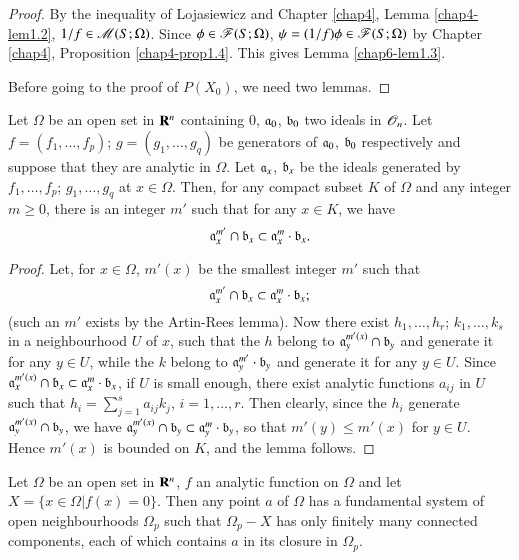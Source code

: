\begin{proof}
By the inequality of Lojasiewicz and Chapter \ref{chap4}, Lemma \ref{chap4-lem1.2}, $1/f\in \mathscr{M}(S;\Omega)$. Since $\phi\in \mathscr{F}(S;\Omega)$, $\psi=(1/f)\phi\in\mathscr{F}(S;\Omega)$ by Chapter \ref{chap4}, Proposition \ref{chap4-prop1.4}. This gives Lemma \ref{chap6-lem1.3}.

Before going to the proof of $P(X_{0})$, we need two lemmas.
\end{proof}

\begin{lemma}\label{chap6-lem1.4}
Let $\Omega$ be an open set in $\mathbf{R}^{n}$ containing $0$, $\mathfrak{a}_{0}$, $\mathfrak{b}_{0}$ two ideals in $\mathscr{O}_{n}$. Let $f=(f_{1},\ldots,f_{p})$; $g=(g_{1},\ldots,g_{q})$ be generators of $\mathfrak{a}_{0}$, $\mathfrak{b}_{0}$ respectively and suppose that they are analytic in $\Omega$. Let $\mathfrak{a}_{x}$, $\mathfrak{b}_{x}$ be the ideals generated by $f_{1},\ldots,f_{p}$; $g_{1},\ldots,g_{q}$ at $x\in \Omega$. Then, for any compact subset $K$ of $\Omega$ and any integer $m\geq 0$, there is an integer $m'$ such that for any $x\in K$, we have
$$
\mathfrak{a}^{m'}_{x}\cap \mathfrak{b}_{x}\subset \mathfrak{a}^{m}_{x}\cdot \mathfrak{b}_{x}.
$$
\end{lemma}

\begin{proof}
Let, for $x\in \Omega$, $m'(x)$ be the smallest integer $m'$ such that
$$
\mathfrak{a}^{m'}_{x}\cap \mathfrak{b}_{x}\subset \mathfrak{a}^{m}_{x}\cdot \mathfrak{b}_{x};
$$
(such an $m'$ exists by the Artin-Rees lemma). Now there exist $h_{1},\ldots,h_{r}$; $k_{1},\ldots,k_{s}$ in a neighbourhood $U$ of $x$, such that the $h$ belong to $\mathfrak{a}^{m'(x)}_{y}\cap \mathfrak{b}_{y}$ and generate it for any $y\in U$, while the $k$ belong to $\mathfrak{a}^{m'}_{y}\cdot \mathfrak{b}_{y}$ and generate it for any $y\in U$. Since $\mathfrak{a}^{m'(x)}_{x}\cap \mathfrak{b}_{x}\subset \mathfrak{a}^{m}_{x}\cdot \mathfrak{b}_{x}$, if $U$ is small enough, there exist analytic functions $a_{ij}$ in $U$ such that $h_{i}=\sum\limits^{s}_{j=1}a_{ij}k_{j}$, $i=1,\ldots,r$. Then clearly, since the $h_{i}$ generate $\mathfrak{a}^{m'(x)}_{y}\cap \mathfrak{b}_{y}$, we have $\mathfrak{a}^{m'(x)}_{y}\cap \mathfrak{b}_{y}\subset \mathfrak{a}^{m}_{y}\cdot \mathfrak{b}_{y}$, so that $m'(y)\leq m'(x)$ for $y\in U$. Hence $m'(x)$ is bounded on $K$, and the lemma follows.
\end{proof}

\begin{lemma}\label{chap6-lem1.5}
Let $\Omega$ be an open set in $\mathbf{R}^{n}$, $f$ an analytic function on $\Omega$ and let $X=\{x\in \Omega | f(x)=0\}$. Then any point $a$ of $\Omega$ has a fundamental system of open neighbourhoods $\Omega_{p}$ such that $\Omega_{p}-X$ has only finitely many connected components, each of which contains $a$ in its closure in $\Omega_{p}$.
\end{lemma}

